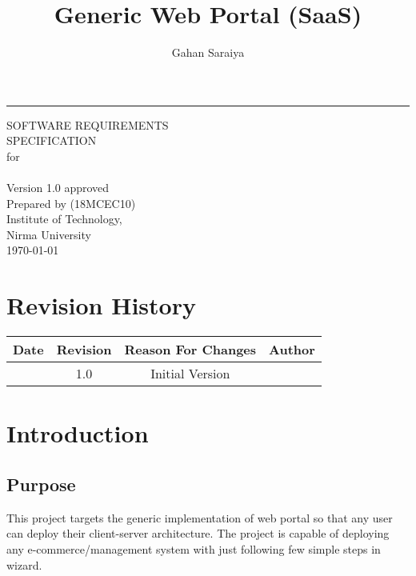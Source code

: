 \documentclass{scrreprt}
\date{}
\title{Generic Web Portal (SaaS)}
\author{Gahan Saraiya}
\def\myversion{1.0 }
\begin{document}
\begin{flushright}
    \rule{16cm}{5pt}\vskip1cm
    \begin{bfseries}
        \Huge{SOFTWARE REQUIREMENTS\\ SPECIFICATION}\\
        for\\
        \vspace{1.9cm}
        \thetitle\\
        \vspace{1.9cm}
        \LARGE{Version \myversion approved}\\
        \vspace{1.9cm}
        Prepared by \theauthor (18MCEC10)\\
        \vspace{1.9cm}
        Institute of Technology,\\Nirma University\\
        \vspace{1.9cm}
        \today\\
    \end{bfseries}
\end{flushright}

\tableofcontents
\listoffigures

\chapter*{Revision History}

\begin{center}
    \begin{tabular}{|c|c|c|c|}
        \hline
	    Date & Revision & Reason For Changes & Author \\
        \hline
	     & 1.0 & Initial Version & \theauthor\\
        \hline
    \end{tabular}
\end{center}
\chapter{Introduction}
\label{introduction}

\section{Purpose}
\label{purpose}
This project targets the generic implementation of web portal so that any user can deploy their client-server architecture.
The project is capable of deploying any e-commerce/management system with just following few simple steps in wizard.
\end{document}
